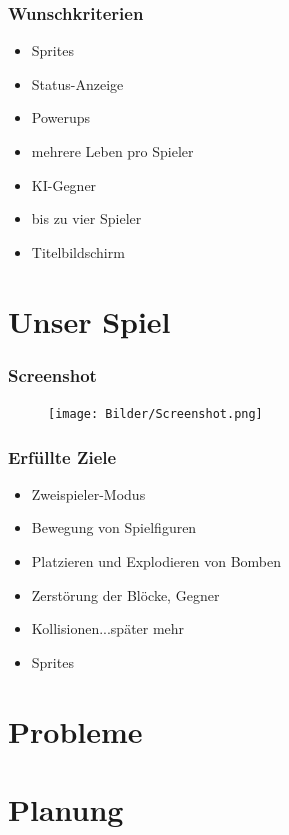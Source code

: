\documentclass[18pt]{beamer}
\begin{document}
		\begin{frame}
			\frametitle{Wunschkriterien}
				\begin{itemize}
					\item Sprites
					\item Status-Anzeige
					\item Powerups
					\item mehrere Leben pro Spieler
					\item KI-Gegner
					\item bis zu vier Spieler
					\item Titelbildschirm
				\end{itemize}
		\end{frame}
	
\section{Unser Spiel}
	\begin{frame}
		\frametitle{Screenshot}
		\begin{figure}[H]
			\centering
			\texttt{[image: Bilder/Screenshot.png]}
			\centering
		\end{figure}
	\end{frame}

	\begin{frame}
		\frametitle{Erfüllte Ziele}
		\begin{itemize}
			\item Zweispieler-Modus
			\item Bewegung von Spielfiguren
			\item Platzieren und Explodieren von Bomben
			\item Zerstörung der Blöcke, Gegner
			\item Kollisionen...später mehr
			\item Sprites
		\end{itemize}
	\end{frame}

\section{Probleme}
	
		
	
\section{Planung}
\end{document}
